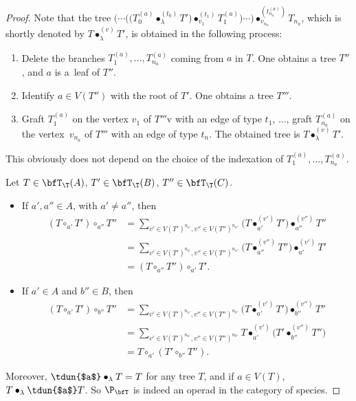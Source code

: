 \begin{proof}
Note that the tree
$\big(\cdots \big(\big(T_0^{(a)}\bullet_\lambda^{(t_0)} T'\big)\bullet_{v_1}^{(t_1)} T_1^{(a)}\big)\cdots\big)
\bullet_{v_{n_a}}^{(t_{n_a}^{(a)})} T_{n_a}$,
which is shortly denoted by $T\bullet_\lambda^{(v)} T'$, is obtained in the following process:
\begin{enumerate}\itemsep=0pt
\item Delete the branches $T_1^{(a)},\dots,T_{n_a}^{(a)}$ coming from $a$ in $T$.
One obtains a tree $T''$, and $a$ is a~leaf of $T''$.
\item Identify $a\in V(T'')$ with the root of $T'$. One obtains a tree $T'''$.
\item Graft $T_1^{(a)}$ on the vertex $v_1$ of $T'''$v with an edge of type $t_1$, $\dots$,
graft $T_{n_a}^{(a)}$ on the vertex~$v_{n_a}$ of $T'''$ with an edge of type $t_n$.
The obtained tree is $T\bullet_\lambda^{(v)} T'$.
\end{enumerate}
This obviously does not depend on the choice of the indexation of $T_1^{(a)},\dots,T_{n_a}^{(a)}$.

Let $T\in \bfT_\T(A)$, $T'\in \bfT_\T(B)$, $T''\in \bfT_\T(C)$.
\begin{itemize}\itemsep=0pt
\item If $a',a''\in A$, with $a'\neq a''$, then
\begin{align*}
(T\circ_{a'} T')\circ_{a''}T''&=\sum_{v'\in V(T')^{n_{a'}},v''\in V(T'')^{n_{a''}}}
\big(T\bullet_{a'}^{(v')}T'\big)\bullet_{a''}^{(v'')} T''
\\
&=\sum_{v'\in V(T')^{n_{a'}},v''\in V(T'')^{n_{a''}}}\big(T\bullet_{a''}^{(v'')}T''\big)\bullet_{a'}^{(v')} T'
\\
&=(T\circ_{a''} T'')\circ_{a'}T'.
\end{align*}
\item If $a'\in A$ and $b''\in B$, then
\begin{align*}
(T\circ_{a'}T')\circ_{b''}T''&=\sum_{v'\in V(T')^{n_{a'}},v''\in V(T'')^{n_{b''}}}
\big(T\bullet_{a'}^{(v')}T'\big)\bullet_{b''}^{(v'')} T''
\\
&=\sum_{v'\in V(T')^{n_{a'}},v''\in V(T'')^{n_{b''}}}T\bullet_{a'}^{(v')}\big(T'\bullet_{b''}^{(v'')} T''\big)
\\
&=T\circ_{a'}(T'\circ_{b''}T'').
\end{align*}
\end{itemize}
Moreover, $\tdun{$a$}\bullet_\lambda T=T$ for any tree $T$, and if $a\in V(T)$, $T\bullet_\lambda \tdun{$a$}T$.
So $\P_\bfT$ is indeed an operad in the category of species. \end{proof}

